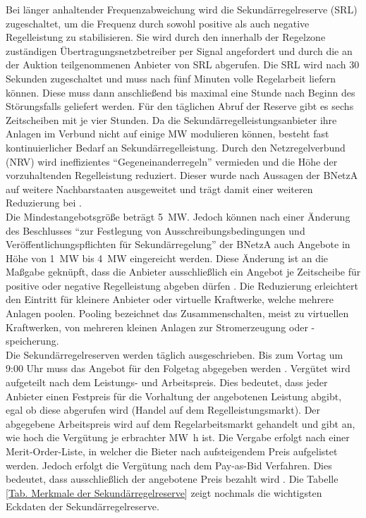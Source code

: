 			Bei länger anhaltender Frequenzabweichung wird die Sekundärregelreserve (SRL) zugeschaltet, um die Frequenz durch sowohl positive als auch negative Regelleistung zu stabilisieren.
			Sie wird durch den innerhalb der Regelzone zuständigen Übertragungsnetzbetreiber per Signal angefordert und durch die an der Auktion teilgenommenen Anbieter von SRL abgerufen. 
			Die SRL wird nach \num{30} Sekunden zugeschaltet und muss nach fünf Minuten volle Regelarbeit liefern können. 
			Diese muss dann anschließend bis maximal eine Stunde nach Beginn des Störungsfalls geliefert werden. 
			Für den täglichen Abruf der Reserve gibt es sechs Zeitscheiben mit je vier Stunden.
			Da die Sekundärregelleistungsanbieter ihre Anlagen im Verbund nicht auf einige \si{\mega\watt} modulieren können, besteht fast kontinuierlicher Bedarf an Sekundärregelleistung.
			Durch den Netzregelverbund (NRV) wird ineffizientes "`Gegeneinanderregeln"' vermieden und die Höhe der vorzuhaltenden Regelleistung reduziert.
			Dieser wurde nach Aussagen der BNetzA auf weitere Nachbarstaaten ausgeweitet und trägt damit einer weiteren Reduzierung bei \cite[S. 207 f.]{Monitoringbericht_BNetzA}. \\
			
			Die Mindestangebotsgröße beträgt \SI{5}{\mega\watt}.
			Jedoch können nach einer Änderung des Beschlusses "`zur Festlegung von Ausschreibungsbedingungen und Veröffentlichungspflichten für Sekundärregelung"' der BNetzA auch Angebote in Höhe von \SI{1}{\mega\watt} bis \SI{4}{\mega\watt} eingereicht werden.
			Diese Änderung ist an die Maßgabe geknüpft, dass die Anbieter ausschließlich ein Angebot je Zeitscheibe für positive oder negative Regelleistung abgeben dürfen \cite{Beschluss_SRL}.
			Die Reduzierung erleichtert den Eintritt für kleinere Anbieter oder virtuelle Kraftwerke, welche mehrere Anlagen poolen.
			Pooling bezeichnet das Zusammenschalten, meist zu virtuellen Kraftwerken, von mehreren kleinen Anlagen zur Stromerzeugung oder -speicherung. \\
			
			Die Sekundärregelreserven werden täglich ausgeschrieben. 
			Bis zum Vortag um 9:00 Uhr muss das Angebot für den Folgetag abgegeben werden \cite{regelleistungnet_PRL_Ausschreibung}.
			Vergütet wird aufgeteilt nach dem Leistungs- und Arbeitspreis.
			Dies bedeutet, dass jeder Anbieter einen Festpreis für die Vorhaltung der angebotenen Leistung abgibt, egal ob diese abgerufen wird (Handel auf dem Regelleistungsmarkt).
			Der abgegebene Arbeitspreis wird auf dem Regelarbeitsmarkt gehandelt und gibt an, wie hoch die Vergütung je erbrachter \si{\mega\watt\hour} ist.
			Die Vergabe erfolgt nach einer Merit-Order-Liste, in welcher die Bieter nach aufsteigendem Preis aufgelistet werden.
			Jedoch erfolgt die Vergütung nach dem Pay-as-Bid Verfahren.
			Dies bedeutet, dass ausschließlich der angebotene Preis bezahlt wird \cite[S. 81 ff.]{Doktorarbeit_Reitsam}.
			Die Tabelle \ref{Tab. Merkmale der Sekundärregelreserve} zeigt nochmals die wichtigsten Eckdaten der Sekundärregelreserve.
			
